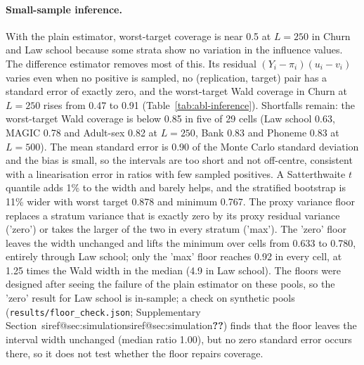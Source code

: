 \documentclass[pdflatex,sn-mathphys-num,iicol]{sn-jnl}
\makeatletter
\theoremstyle{thmstyleone}
\theoremstyle{thmstyletwo}
\theoremstyle{thmstylethree}
\newcommand{\SIref}[1]{\ifcsname siref@#1\endcsname\csname siref@#1\endcsname\else\textbf{??}\fi}
\makeatother
\begin{document}
\paragraph{Small-sample inference.} With the plain estimator, worst-target coverage is near 0.5 at $L=250$ in Churn and Law school because some strata show no variation in the influence values. The difference estimator removes most of this. Its residual $(Y_i-\pi_i)(u_i-v_i)$ varies even when no positive is sampled, no (replication, target) pair has a standard error of exactly zero, and the worst-target Wald coverage in Churn at $L=250$ rises from 0.47 to 0.91 (Table~\ref{tab:abl-inference}). Shortfalls remain: the worst-target Wald coverage is below 0.85 in five of 29 cells (Law school 0.63, MAGIC 0.78 and Adult-sex 0.82 at $L=250$, Bank 0.83 and Phoneme 0.83 at $L=500$). The mean standard error is 0.90 of the Monte Carlo standard deviation and the bias is small, so the intervals are too short and not off-centre, consistent with a linearisation error in ratios with few sampled positives. A Satterthwaite $t$ quantile adds 1\% to the width and barely helps, and the stratified bootstrap is 11\% wider with worst target 0.878 and minimum 0.767. The proxy variance floor replaces a stratum variance that is exactly zero by its proxy residual variance ('zero') or takes the larger of the two in every stratum ('max'). The 'zero' floor leaves the width unchanged and lifts the minimum over cells from 0.633 to 0.780, entirely through Law school; only the 'max' floor reaches 0.92 in every cell, at 1.25 times the Wald width in the median (4.9 in Law school). The floors were designed after seeing the failure of the plain estimator on these pools, so the 'zero' result for Law school is in-sample; a check on synthetic pools (\texttt{results/floor\_check.json}; Supplementary Section~\SIref{sec:simulation}) finds that the floor leaves the interval width unchanged (median ratio 1.00), but no zero standard error occurs there, so it does not test whether the floor repairs coverage.
\end{document}
